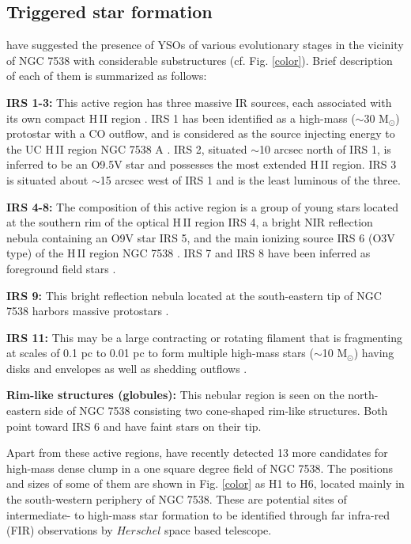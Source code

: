 \documentclass[a4paper,fleqn,usenatbib,useAMS]{mnras}
\begin{document}
\subsection{Triggered star formation}

\citet{1991MmSAI..62..715M} have suggested the presence of YSOs
of various evolutionary stages in the vicinity of NGC 7538 with considerable 
substructures (cf. Fig. \ref{color}). 
Brief description of each of them is summarized as follows:

\noindent
{\bf IRS 1-3:} This active region has three massive IR sources, each associated with its own compact H\,{\sevensize II}  region \citep{1974ApJ...187..473W}.
IRS 1 has been identified as a high-mass ($\sim$30 M$_\odot$) protostar with a CO outflow, 
and is considered as the source injecting energy to the UC H\,{\sevensize II}  region NGC 7538 A \citep{2010A&A...517A...2P}.
IRS 2, situated $\sim$10 arcsec north of IRS 1, is inferred to be an 
O9.5V star and possesses the most extended H\,{\sevensize II}  region. 
IRS 3 is situated about $\sim$15 arcsec west of IRS 1 \citep{2004ApJ...616.1042O}
and is the least luminous of the three.

\noindent
{\bf IRS 4-8:} The composition of this active region is a group of young stars located at the southern 
rim of the optical H\,{\sevensize II}  region IRS 4,
a bright NIR reflection nebula containing an O9V star IRS 5, 
and the  main ionizing source  IRS 6 (O3V type) of the H\,{\sevensize II}  region NGC 7538 \citep{2010A&A...517A...2P}. 
IRS 7 and IRS 8 have been inferred as foreground field stars \citep{2005prpl.conf.8307T,2010A&A...517A...2P}.

\noindent
{\bf IRS 9:} This bright reflection nebula  located at the south-eastern tip of NGC 7538 harbors 
massive protostars \citep{1979MNRAS.188..463W,2006A&A...448L..57P, 2010A&A...517A...2P}.

\noindent
{\bf IRS 11:} This may be a large contracting or rotating filament that is
fragmenting at scales of 0.1 pc to 0.01 pc to form multiple high-mass stars  
($\sim$10 M$_\odot$) having disks and envelopes as well as shedding outflows 
\citep{2006A&A...448L..57P,2012ApJ...757...58N}. 

\noindent
{\bf Rim-like structures (globules):} This nebular region is seen on the north-eastern side of 
NGC 7538 consisting two cone-shaped rim-like structures.
Both point toward IRS 6 and have faint stars on their tip.

\noindent
Apart from these active regions, \citet{2013ApJ...773..102F} have recently detected 13 more candidates for 
high-mass dense clump in a one square degree field of NGC 7538.
The positions and sizes of some of them are shown in Fig. \ref{color} as H1 to H6, located mainly in the south-western periphery of NGC 7538.
These are potential sites of intermediate- to high-mass star formation to be identified 
through far infra-red (FIR) observations by $Herschel$ space based telescope. 
\end{document}
